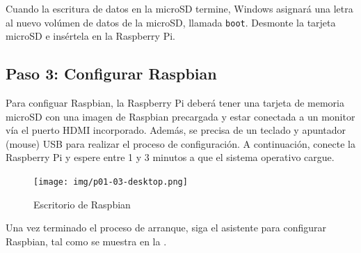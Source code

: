 \documentclass[letterpaper,10.5pt]{article}
\begin{document}
Cuando la escritura de datos en la microSD termine, Windows asignará una letra al nuevo volúmen de datos de la microSD, llamada \texttt{boot}.
Desmonte la tarjeta microSD e insértela en la Raspberry Pi.

%
%
\clearpage
\subsection{Paso 3: Configurar Raspbian}%
Para configuar Raspbian, la Raspberry Pi deberá tener una tarjeta de memoria microSD con una imagen de Raspbian precargada y estar conectada a un monitor vía el puerto HDMI incorporado.
Además, se precisa de un teclado y apuntador (mouse) USB para realizar el proceso de configuración.
A continuación, conecte la Raspberry Pi y espere entre 1 y 3 minutos a que el sistema operativo cargue.

\begin{figure}[H]
	\centering
	\texttt{[image: img/p01-03-desktop.png]} %
	\caption{Escritorio de Raspbian}
	\label{fig:raspbian-desktop} %
\end{figure}

Una vez terminado el proceso de arranque, siga el asistente para configurar Raspbian, tal como se muestra en la .
\end{document}
